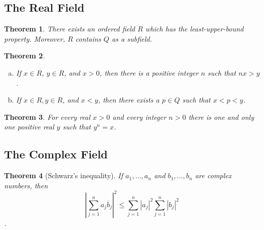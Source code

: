 \documentclass{article}
\newtheorem{theorem}{Theorem}
\numberwithin{theorem}{section}
\begin{document}
\subsection*{The Real Field}

\setcounter{theorem}{18}
\begin{theorem}
  There exists an ordered field $R$ which has the least-upper-bound property.
  Moreover, $R$ contains $Q$ as a subfield.
\end{theorem}

\begin{theorem}
  \begin{enumerate}[(a)]
    \item If $x \in R$, $y \in R$, and $x > 0$, then there is a positive integer
      $n$ such that $nx > y$.
    \item If $x \in R, y \in R$, and $x < y$, then there exists a $p \in Q$ such
      that $x < p < y$.
  \end{enumerate}
\end{theorem}

\begin{theorem}
  For every real $x > 0$ and every integer $n > 0$ there is one and only one
  positive real $y$ such that $y^n = x$.
\end{theorem}

\subsection*{The Complex Field}

\setcounter{theorem}{34}
\begin{theorem}[Schwarz's inequality]
  If $a_1, \ldots, a_n$ and $b_1, \ldots, b_n$ are complex numbers, then \[
    \left|\sum_{j=1}^n a_j\overline{b}_j\right|^2 \leq
    \sum_{j=1}^n |a_j|^2 \sum_{j=1}^n |b_j|^2
  \].
\end{theorem}
\end{document}
